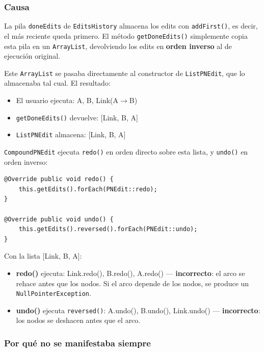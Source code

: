 \documentclass[12pt,a4paper]{article}
\newcommand{\code}[1]{\texttt{#1}}
\newcommand{\clase}[1]{\texttt{#1}}
\newcommand{\metodo}[1]{\texttt{#1}}
\begin{document}
\subsubsection{Causa}

La pila \code{doneEdits} de \clase{EditsHistory} almacena los edits con
\metodo{addFirst()}, es decir, el más reciente queda primero. El método
\metodo{getDoneEdits()} simplemente copia esta pila en un \clase{ArrayList},
devolviendo los edits en \textbf{orden inverso} al de ejecución original.

Este \clase{ArrayList} se pasaba directamente al constructor de
\clase{ListPNEdit}, que lo almacenaba tal cual. El resultado:

\begin{itemize}
  \item El usuario ejecuta: A, B, Link(A$\to$B)
  \item \code{getDoneEdits()} devuelve: [Link, B, A]
  \item \clase{ListPNEdit} almacena: [Link, B, A]
\end{itemize}

\clase{CompoundPNEdit} ejecuta \metodo{redo()} en orden directo sobre esta
lista, y \metodo{undo()} en orden inverso:

\begin{lstlisting}[caption={Métodos \metodo{redo()} y \metodo{undo()} de
  \clase{CompoundPNEdit}.}, label=lst:compound]
@Override public void redo() {
    this.getEdits().forEach(PNEdit::redo);
}

@Override public void undo() {
    this.getEdits().reversed().forEach(PNEdit::undo);
}
\end{lstlisting}

Con la lista [Link, B, A]:
\begin{itemize}
  \item \textbf{redo()} ejecuta: Link.redo(), B.redo(), A.redo() ---
        \textbf{incorrecto}: el arco se rehace antes que los nodos.
        Si el arco depende de los nodos, se produce un
        \code{NullPointerException}.
  \item \textbf{undo()} ejecuta \code{reversed()}: A.undo(), B.undo(),
        Link.undo() --- \textbf{incorrecto}: los nodos se deshacen antes
        que el arco.
\end{itemize}

\subsubsection{Por qué no se manifestaba siempre}
\end{document}
